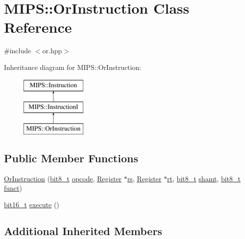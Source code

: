 \hypertarget{classMIPS_1_1OrInstruction}{}\section{M\+I\+PS\+:\+:Or\+Instruction Class Reference}
\label{classMIPS_1_1OrInstruction}


{\ttfamily \#include $<$or.\+hpp$>$}

Inheritance diagram for M\+I\+PS\+:\+:Or\+Instruction\+:\begin{figure}[H]
\begin{center}
\leavevmode
\includegraphics[height=3.000000cm]{classMIPS_1_1OrInstruction}
\end{center}
\end{figure}
\subsection*{Public Member Functions}
\begin{DoxyCompactItemize}
\item 
\hyperlink{classMIPS_1_1OrInstruction_a5e9d9d3677eaf08e528c186149d59662}{Or\+Instruction} (\hyperlink{core_8hpp_a6074bae122ae7b527864eec42c728c3c}{bit8\+\_\+t} \hyperlink{classMIPS_1_1Instruction_a45cc6808b5dde8a5d41067d148b55476}{opcode}, \hyperlink{classMIPS_1_1Register}{Register} $\ast$\hyperlink{classMIPS_1_1InstructionI_a2be191d5b3dce505e2e626ec02eb4d62}{rs}, \hyperlink{classMIPS_1_1Register}{Register} $\ast$\hyperlink{classMIPS_1_1InstructionI_add1db07a5c954f35271de8c8a5737487}{rt}, \hyperlink{core_8hpp_a6074bae122ae7b527864eec42c728c3c}{bit8\+\_\+t} \hyperlink{classMIPS_1_1InstructionI_aa9b6da37c374c2ec8d96448d341e5e7d}{shamt}, \hyperlink{core_8hpp_a6074bae122ae7b527864eec42c728c3c}{bit8\+\_\+t} \hyperlink{classMIPS_1_1InstructionI_a5c6efcbbd233a7447c1fe24ea0a1e558}{funct})
\item 
\hyperlink{core_8hpp_adc265a970bc35995b5879784bbb3f1b7}{bit16\+\_\+t} \hyperlink{classMIPS_1_1OrInstruction_a89859e0bcb3e5ed7f1c53f33f627f041}{execute} ()
\end{DoxyCompactItemize}
\subsection*{Additional Inherited Members}


